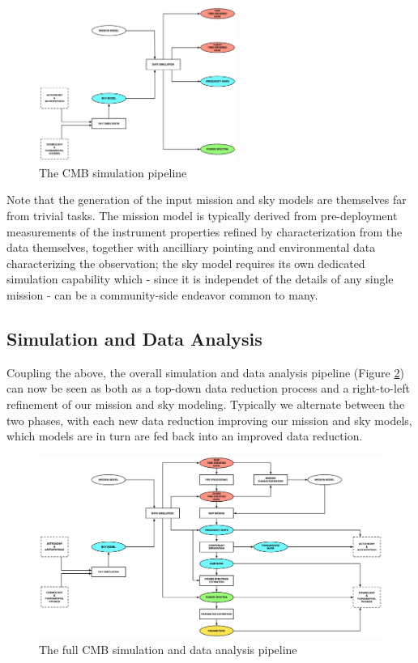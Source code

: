 \begin{figure}[htbp]
\centering
\includegraphics[width=0.575\textwidth]{Analysis/sim}
\caption{The CMB simulation pipeline}
\label{fig_sim}
\end{figure}

Note that the generation of the input mission and sky models are themselves far from trivial tasks. The mission model is typically derived from pre-deployment measurements of the instrument properties refined by characterization from the data themselves, together with ancilliary pointing and environmental data characterizing the observation; the sky model requires its own dedicated simulation capability which - since it is independet of the details of any single mission - can be a community-side endeavor common to many.

\subsection{Simulation and Data Analysis}

Coupling the above, the overall simulation and data analysis pipeline (Figure \ref{fig_simda}) can now be seen as both as a top-down data reduction process and a right-to-left refinement of our mission and sky modeling. Typically we alternate between the two phases, with each new data reduction improving our mission and sky models, which models are in turn are fed back into an improved data reduction.

\begin{figure}[htbp]
\includegraphics[width=1\textwidth]{Analysis/simda}
\caption{The full CMB simulation and data analysis pipeline}
\label{fig_simda}
\end{figure}

